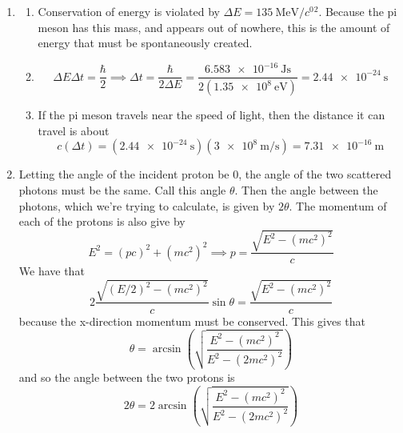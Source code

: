 \documentclass[fleqn]{article}[12pt]
\begin{document}
\begin{enumerate}
\begin{enumerate}
    \end{enumerate}

        \item \begin{enumerate}
            \item Conservation of energy is violated by $\Delta E = \SI{135}{\MeV/\clight^2}$. Because the pi meson has this mass, and appears out of nowhere, this is the amount of energy that must be spontaneously created.

            \item
            \begin{equation*}
                \Delta E \Delta t = \frac{\hbar}{2} \implies \Delta t = \frac{\hbar}{2\Delta E} = \frac{\SI{6.583e-16}{\joule\s}}{2(\SI{1.35e8}{\eV})} = \SI{2.44e-24}{\s}
            \end{equation*}

            \item If the pi meson travels near the speed of light, then the distance it can travel is about
            \begin{equation*}
                c(\Delta t) = (\SI{2.44e-24}{\s})(\SI{3e8}{\m/\s}) = \SI{7.31e-16}{\m}
            \end{equation*}
        \end{enumerate}

        \item Letting the angle of the incident proton be 0, the angle of the two scattered photons must be the same. Call this angle $\theta$. Then the angle between the photons, which we're trying to calculate, is given by $2\theta$. The momentum of each of the protons is also give by
        \begin{equation*}
            E^2 = (pc)^2 + (mc^2)^2 \implies p = \frac{\sqrt{E^2-(mc^2)^2}}{c}
        \end{equation*}
        We have that
        \begin{equation*}
            2 \frac{\sqrt{(E/2)^2-(mc^2)^2}}{c} \sin \theta = \frac{\sqrt{E^2-(mc^2)^2}}{c}
        \end{equation*}
        because the x-direction momentum must be conserved. This gives that
        \begin{equation*}
            \theta = \arcsin \left(\sqrt{\frac{E^2-(mc^2)^2}{E^2-(2mc^2)^2}}\right)
        \end{equation*}
        and so the angle between the two protons is
        \begin{equation*}
            2\theta = 2\arcsin \left(\sqrt{\frac{E^2-(mc^2)^2}{E^2-(2mc^2)^2}}\right)
        \end{equation*}
    \end{enumerate}
\end{document}

